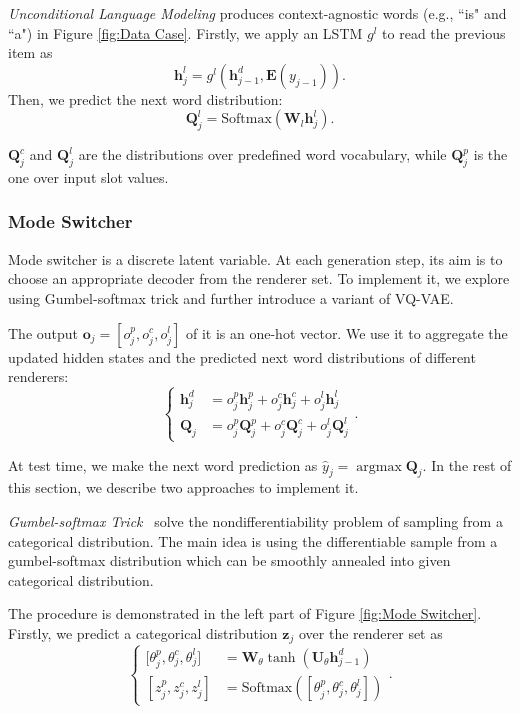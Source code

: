 \documentclass[letterpaper]{article} %
\begin{document}
	\textit{Unconditional Language Modeling} produces context-agnostic words (e.g., ``is" and ``a") in Figure \ref{fig:Data Case}. Firstly, we apply an LSTM $g^l$ to read the previous item as
	\begin{equation}
	\mathbf{h}_j^l = g^l(\mathbf{h}_{j-1}^d, \mathbf{E}(y_{j-1})).
	\end{equation}
	Then, we predict the next word distribution:
	\begin{equation}
	\mathbf{Q}^l_j = \mathrm{Softmax}(\mathbf{W}_l \mathbf{h}_j^l).
	\end{equation}

	$\mathbf{Q}^c_j$ and $\mathbf{Q}^l_j$ are the distributions over predefined word vocabulary, while $\mathbf{Q}^p_j$ is the one over input slot values.

\subsubsection{Mode Switcher}

	Mode switcher is a discrete latent variable. At each generation step, its aim is to choose an appropriate decoder from the renderer set. To implement it, we explore using Gumbel-softmax trick and further introduce a variant of VQ-VAE.

	The output $\mathbf{o}_j = [o_j^p, o_j^c, o_j^l]$ of it is an one-hot vector. We use it to aggregate the updated hidden states and the predicted next word distributions of different renderers:
	\begin{equation}
	\label{equ:Equation 11}
	\left\{\begin{aligned}
	\mathbf{h}^d_j & = o_j^p\mathbf{h}_j^p + o_j^c\mathbf{h}_j^c + o_j^l\mathbf{h}_j^l \\
	\mathbf{Q}_j & = o_j^p\mathbf{Q}_j^p + o_j^c\mathbf{Q}_j^c + o_j^l\mathbf{Q}_j^l
	\end{aligned}\right..
	\end{equation}

	At test time, we make the next word prediction as $\hat{y}_j = \mathop{\arg\max} \mathbf{Q}_j$.  In the rest of this section, we describe two approaches to implement it.

	\textit{Gumbel-softmax Trick}~\citep{jang2016categorical} solve the nondifferentiability problem of sampling from a categorical distribution. The main idea is using the differentiable sample from a gumbel-softmax distribution which can be smoothly annealed into given categorical distribution.

	The procedure is demonstrated in the left part of Figure \ref{fig:Mode Switcher}. Firstly, we predict a categorical distribution $\mathbf{z}_j$ over the renderer set as
	\begin{equation}
	\label{equ: Equation 12}
	\left\{\begin{aligned}
	\mathrm{[} \theta_j^p, \theta_j^c, \theta_j^l ] & = \mathbf{W}_\theta\tanh(\mathbf{U}_\theta\mathbf{h}^d_{j-1}) \\
	[ z_j^p, z_j^c, z_j^l ] & = \mathrm{Softmax}([ \theta_j^p, \theta_j^c, \theta_j^l ])
	\end{aligned}\right..
	\end{equation}
\end{document}
